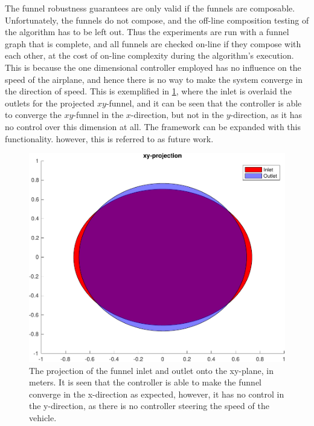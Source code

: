 The funnel robustness guarantees are only valid if the funnels are composable.
Unfortunately, the funnels do not compose, and the off-line composition testing
of the algorithm has to be left out. Thus the experiments are run with a funnel
graph that is complete, and all funnels are checked on-line if they compose with
each other, at the cost of on-line complexity during the algorithm's execution.
This is because the one dimensional controller employed has no influence on the
speed of the airplane, and hence there is no way to make the system converge in
the direction of speed. This is exemplified in \cref{fig:funnel-inlet-outlet},
where the inlet is overlaid the outlets for the projected \(xy\)-funnel, and it
can be seen that the controller is able to converge the \(xy\)-funnel in
the \(x\)-direction, but not in the \(y\)-direction, as it has no control over
this dimension at all. The framework can be expanded with this functionality.
however, this is referred to as future work.

\begin{figure}[!t]
    \centering
    \includegraphics[width=.8\columnwidth]{figures/experiments/funnel-inlet-outlet}
    \caption[The projection of the funnel inlet and outlet in the xy-plane]{The projection of the funnel inlet and outlet onto the xy-plane, in meters. It is
    seen that the controller is able to make the funnel converge in the
    x-direction as expected, however, it has no control in the y-direction, as
    there is no controller steering the speed of the vehicle.}
    \label{fig:funnel-inlet-outlet}
\end{figure}

\label{subsec:check-vehicle-in-funnel}

